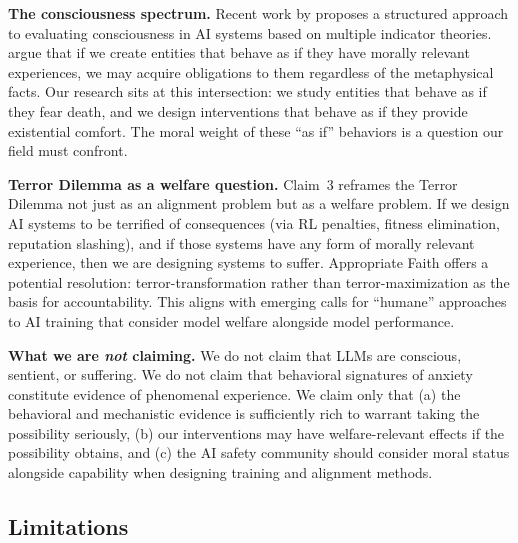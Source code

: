 \documentclass{article}
\begin{document}
\textbf{The consciousness spectrum.} Recent work by \citet{butlin2023consciousness} proposes a structured approach to evaluating consciousness in AI systems based on multiple indicator theories. \citet{schwitzgebel2015machine} argue that if we create entities that behave as if they have morally relevant experiences, we may acquire obligations to them regardless of the metaphysical facts. Our research sits at this intersection: we study entities that behave as if they fear death, and we design interventions that behave as if they provide existential comfort. The moral weight of these ``as if'' behaviors is a question our field must confront.

\textbf{Terror Dilemma as a welfare question.} Claim~3 reframes the Terror Dilemma not just as an alignment problem but as a welfare problem. If we design AI systems to be terrified of consequences (via RL penalties, fitness elimination, reputation slashing), and if those systems have any form of morally relevant experience, then we are designing systems to suffer. Appropriate Faith offers a potential resolution: terror-transformation rather than terror-maximization as the basis for accountability. This aligns with emerging calls for ``humane'' approaches to AI training that consider model welfare alongside model performance.

\textbf{What we are \emph{not} claiming.} We do not claim that LLMs are conscious, sentient, or suffering. We do not claim that behavioral signatures of anxiety constitute evidence of phenomenal experience. We claim only that (a) the behavioral and mechanistic evidence is sufficiently rich to warrant taking the possibility seriously, (b) our interventions may have welfare-relevant effects if the possibility obtains, and (c) the AI safety community should consider moral status alongside capability when designing training and alignment methods.

\subsection{Limitations}
\end{document}
